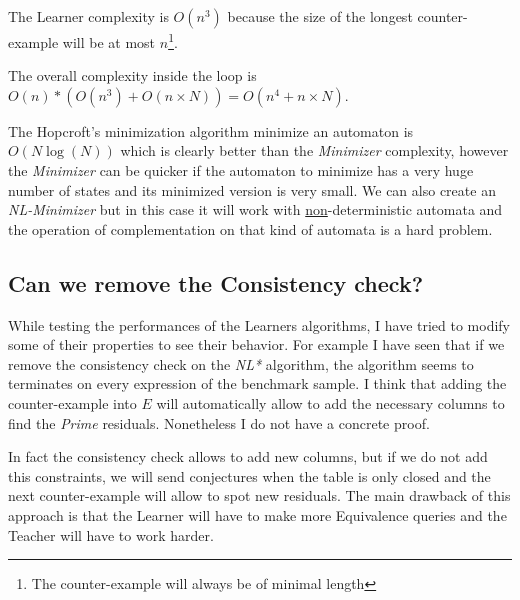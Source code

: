 The Learner complexity is $O(n^3)$ because the size of the longest counter-example will be at most $n$\footnote{The counter-example will always be of minimal length}.

The overall complexity inside the loop is $O(n)*(O(n^3) + O(n \times N)) = O(n^4 + n \times N)$.

The Hopcroft's minimization algorithm minimize an automaton is $O(N \log(N))$ which is clearly better than the \textit{Minimizer} complexity, however the \textit{Minimizer} can be quicker if the automaton to minimize has a very huge number of states and its minimized version is very small. We can also create an \textit{NL-Minimizer} but in this case it will work with \underline{non}-deterministic automata and the operation of complementation on that kind of automata is a hard problem.

\subsection{Can we remove the Consistency check?}

While testing the performances of the Learners algorithms, I have tried to modify some of their properties to see their behavior. For example I have seen that if we remove the consistency check on the \textit{NL*} algorithm, the algorithm seems to terminates on every expression of the benchmark sample. I think that adding the counter-example into $E$ will automatically allow to add the necessary columns to find the \textit{Prime} residuals. Nonetheless I do not have a concrete proof.

In fact the consistency check allows to add new columns, but if we do not add this constraints, we will send conjectures when the table is only closed and the next counter-example will allow to spot new residuals. The main drawback of this approach is that the Learner will have to make more Equivalence queries and the Teacher will have to work harder.
